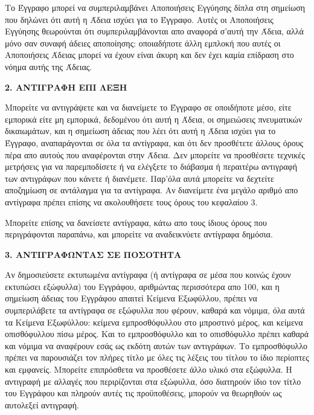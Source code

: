 Το Έγγραφο μπορεί να συμπεριλαμβάνει Αποποιήσεις Εγγύησης δίπλα στη σημείωση που δηλώνει ότι αυτή η Άδεια ισχύει για το Έγγραφο. Αυτές οι Αποποιήσεις Εγγύησης θεωρούνται ότι συμπεριλαμβάνονται απο αναφορά σ'αυτή την Άδεια, αλλά μόνο σαν συναφή άδειες αποποίησης: οποιαδήποτε άλλη εμπλοκή που αυτές οι Αποποιήσεις Άδειας μπορεί να έχουν είναι άκυρη και δεν έχει καμία επίδραση στο νόημα αυτής της Άδειας.


\begin{center}
{\Large\bf 2. ΑΝΤΙΓΡΑΦΗ ΕΠΙ ΛΕΞΗ\par}
\end{center}

Μπορείτε να αντιγράψετε και να διανείμετε το Έγγραφο σε οποιδήποτε μέσο, είτε εμπορικά είτε μη εμπορικά, δεδομένου ότι αυτή η Άδεια, οι σημειώσεις πνευματικών δικαιωμάτων, και η σημείωση άδειας που λέει ότι αυτή η Άδεια ισχύει για το Έγγραφο, αναπαράγονται σε όλα τα αντίγραφα, και ότι δεν προσθέτετε άλλους όρους πέρα απο αυτούς που αναφέρονται στην Άδεια. Δεν μπορείτε να προσθέσετε τεχνικές μετρήσεις για να παρεμποδίσετε ή να ελέγξετε το διάβασμα ή περαιτέρω αντιγραφή των αντιγράφων που κάνετε ή διανέμετε. Παρ'όλα αυτά μπορείτε να δεχτείτε αποζημίωση σε αντάλαγμα για τα αντίγραφα. Αν διανείμετε ένα μεγάλο αριθμό απο αντίγραφα πρέπει επίσης να ακολουθήσετε τους όρους του κεφαλαίου 3.

Μπορείτε επίσης να δανείσετε αντίγραφα, κάτω απο τους ίδιους όρους που περιγράφονται παραπάνω, και μπορείτε να αναδεικνύετε αντίγραφα δημόσια.


\begin{center}
{\Large\bf 3. ΑΝΤΙΓΡΑΦΩΝΤΑΣ ΣΕ ΠΟΣΟΤΗΤΑ\par}
\end{center}


Αν δημοσιεύσετε εκτυπωμένα αντίγραφα (ή αντίγραφα σε μέσα που κοινώς έχουν εκτυπώσει εξώφυλλα) του Εγγράφου, αριθμώντας περισσότερα απο 100, και η σημείωση άδειας του Εγγράφου απαιτεί Κείμενα Εξωφύλλου, πρέπει να συμπεριλάβετε τα αντίγραφα σε εξώφυλλα που φέρουν, καθαρά και νόμιμα, όλα αυτά τα Κείμενα Εξωφύλλου: κείμενα εμπροσθόφυλλου στο μπροστινό μέρος, και κείμενα οπισθόφυλλου πίσω μέρος. Και το εμπροσθόφυλλο και το οπισθόφυλλο πρέπει καθαρά και νόμιμα να αναφέρουν εσάς ως εκδότη αυτών των αντιγράφων. Το εμπροσθόφυλλο πρέπει να παρουσιάζει τον πλήρες τίτλο με όλες τις λέξεις του τίτλου το ίδιο περίοπτες και εμφανείς. Μπορείτε επιπρόσθετα να προσθέσετε άλλο υλικό στα εξώφυλλα. Η αντιγραφή με αλλαγές που περιρίζονται στα εξώφυλλα, όσο διατηρούν ίδιο τον τίτλο του Εγγράφου και πληρούν αυτές τις προϋποθέσεις, μπορούν να θεωρηθούν ως αυτολεξεί αντιγραφή.

